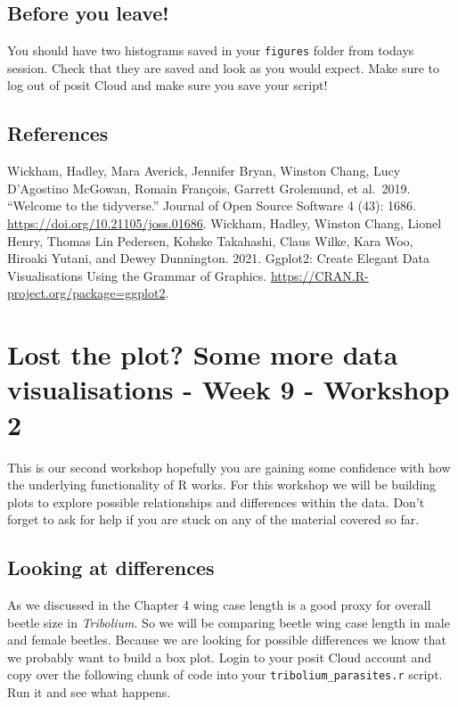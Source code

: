 \documentclass[
]{book}
\begin{document}
\section{Before you leave!}\label{before-you-leave-2}

You should have two histograms saved in your \texttt{figures} folder from todays session. Check that they are saved and look as you would expect. Make sure to log out of posit Cloud and make sure you save your script!

\section{References}\label{references-3}

Wickham, Hadley, Mara Averick, Jennifer Bryan, Winston Chang, Lucy D'Agostino McGowan, Romain François, Garrett Grolemund, et al.~2019. ``Welcome to the tidyverse.'' Journal of Open Source Software 4 (43): 1686. \url{https://doi.org/10.21105/joss.01686}.
Wickham, Hadley, Winston Chang, Lionel Henry, Thomas Lin Pedersen, Kohske Takahashi, Claus Wilke, Kara Woo, Hiroaki Yutani, and Dewey Dunnington. 2021. Ggplot2: Create Elegant Data Visualisations Using the Grammar of Graphics. \url{https://CRAN.R-project.org/package=ggplot2}.

\chapter{Lost the plot? Some more data visualisations - Week 9 - Workshop 2}\label{lost-the-plot-some-more-data-visualisations---week-9---workshop-2}

This is our second workshop hopefully you are gaining some confidence with how the underlying functionality of R works. For this workshop we will be building plots to explore possible relationships and differences within the data. Don't forget to ask for help if you are stuck on any of the material covered so far.

\section{Looking at differences}\label{boxplot}

As we discussed in the Chapter 4 wing case length is a good proxy for overall beetle size in \emph{Tribolium}. So we will be comparing beetle wing case length in male and female beetles. Because we are looking for possible differences we know that we probably want to build a box plot. Login to your posit Cloud account and copy over the following chunk of code into your \texttt{tribolium\_parasites.r} script. Run it and see what happens.
\end{document}
